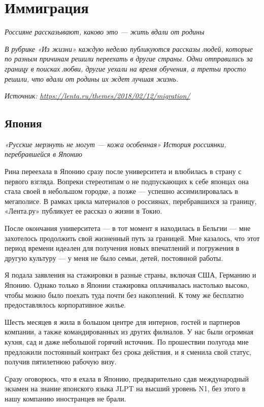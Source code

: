 \chapter{Иммиграция}

\textit{Россияне рассказывают, каково это — жить вдали от родины}

{
    \it В рубрике «Из жизни» каждую неделю публикуются рассказы людей, которые по разным причинам решили переехать в другие страны. Одни отправились за границу в поисках любви, другие уехали на время обучения, а третьи просто решили, что вдали от родины их ждет лучшая жизнь.
}

\textit{Источник: \url{https://lenta.ru/themes/2018/02/12/migration/}}

\section{Япония}

\textit{«Русские мерзнуть не могут — кожа особенная» История россиянки, перебравшейся в Японию}

Рина переехала в Японию сразу после университета и влюбилась в страну с первого взгляда. Вопреки стереотипам о не подпускающих к себе японцах она стала своей в небольшом городке, а позже — успешно ассимилировалась в мегаполисе. В рамках цикла материалов о россиянах, перебравшихся за границу, «Лента.ру» публикует ее рассказ о жизни в Токио.

После окончания университета — в тот момент я находилась в Бельгии — мне захотелось продолжить свой жизненный путь за границей. Мне казалось, что этот период времени идеален для получения новых впечатлений и погружения в другую культуру — у меня не было семьи, детей, постоянной работы.

Я подала заявления на стажировки в разные страны, включая США, Германию и Японию. Однако только в Японии стажировка оплачивалась настолько высоко, чтобы можно было поехать туда почти без накоплений. К тому же бесплатно предоставлялось корпоративное жилье.

Шесть месяцев я жила в большом центре для интернов, гостей и партнеров компании, а также командированных из других филиалов. У нас были огромная кухня, сад и даже небольшой горячий источник. По прошествии полугода мне предложили постоянный контракт без срока действия, и я сменила свой статус, получив пятилетнюю рабочую визу.

Сразу оговорюсь, что я ехала в Японию, предварительно сдав международный экзамен на знание японского языка JLPT на высший уровень N1, без этого в нашу компанию иностранцев не брали.

